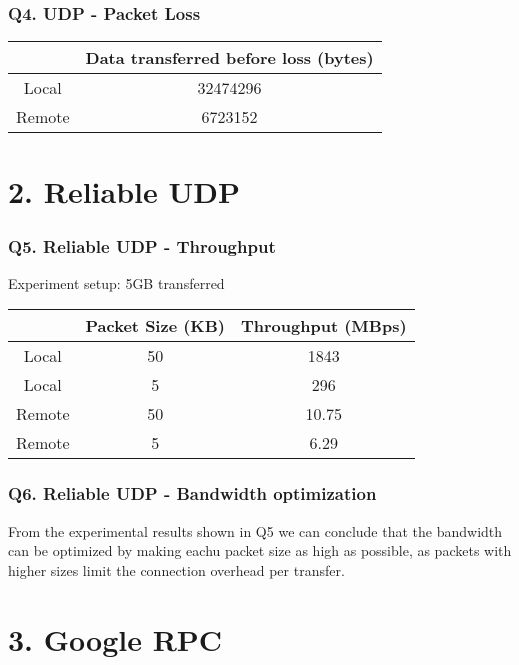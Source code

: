 \documentclass[a4paper]{article}
\begin{document}
\section*{Q4. UDP - Packet Loss} \label{udp_packet_loss}
\begin{center}
	\begin{tabular}{ |c|c| } 
		\hline
		& Data transferred before loss (bytes) \\ 
		\hline
		\hline
		Local & 32474296 \\ 
		\hline
		Remote & 6723152 \\ 
		\hline
	\end{tabular}
\end{center}

\newpage

\part*{2. Reliable UDP}

\section*{Q5. Reliable UDP - Throughput} \label{reliable_udp_throughput}
Experiment setup: 5GB transferred
\begin{center}
	\begin{tabular}{ |c|c|c| } 
		\hline
		& Packet Size (KB) & Throughput (MBps) \\ 
		\hline
		\hline
		Local & 50 & 1843 \\ 
		\hline
		Local & 5 & 296 \\ 
		\hline
		Remote & 50 & 10.75 \\ 
		\hline
		Remote & 5 & 6.29 \\ 
		\hline
	\end{tabular}
\end{center}

\section*{Q6. Reliable UDP - Bandwidth optimization}
From the experimental results shown in Q5 we can conclude that the bandwidth can be optimized by making eachu packet size as high as possible, as packets with higher sizes limit the connection overhead per transfer.

\newpage

\part*{3. Google RPC}
\end{document}
